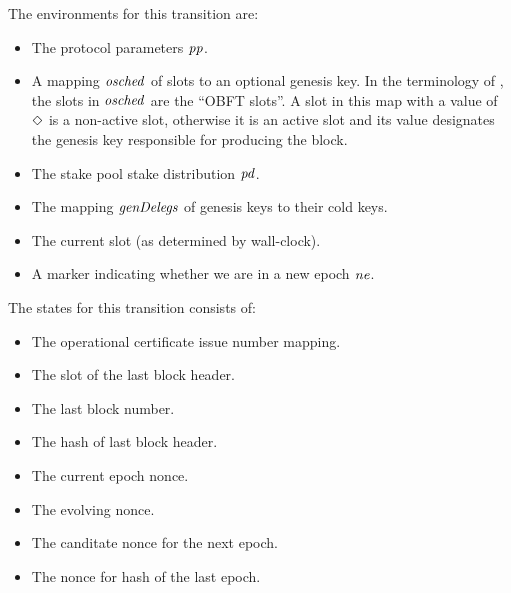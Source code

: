The environments for this transition are:
\begin{itemize}
  \item The protocol parameters $\mathit{pp}$.
  \item A mapping $\mathit{osched}$ of slots to an optional genesis key.
    In the terminology of \cite{delegation_design},
    the slots in $\mathit{osched}$ are the ``OBFT slots''.
    A slot in this map with a value of $\Diamond$ is a non-active slot,
    otherwise it is an active slot and its value designates the genesis key
    responsible for producing the block.
  \item The stake pool stake distribution $\mathit{pd}$.
  \item The mapping $\mathit{genDelegs}$ of genesis keys to their cold keys.
  \item The current slot (as determined by wall-clock).
  \item A marker indicating whether we are in a new epoch $\mathit{ne}$.
\end{itemize}

The states for this transition consists of:
\begin{itemize}
  \item The operational certificate issue number mapping.
  \item The slot of the last block header.
  \item The last block number.
  \item The hash of last block header.
  \item The current epoch nonce.
  \item The evolving nonce.
  \item The canditate nonce for the next epoch.
  \item The nonce for hash of the last epoch.
\end{itemize}

